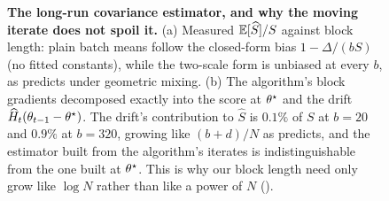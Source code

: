 \begin{figure}[tbp]
\centering
{}
\caption{\textbf{The long-run covariance estimator, and why the moving iterate does not
spoil it.} (a) Measured $\mathbb{E}[\widehat S]/S$ against block length: plain batch means follow
the closed-form bias $1-\Delta/(bS)$ (no fitted constants), while the two-scale form is
unbiased at every $b$, as  predicts under geometric mixing.
(b) The algorithm's block gradients decomposed exactly into the score at $\theta^\star$ and the
drift $\widehat H_t(\theta_{t-1}-\theta^\star)$. The drift's contribution to $\widehat S$ is $0.1\%$
of $S$ at $b=20$ and $0.9\%$ at $b=320$, growing like $(b+d)/N$ as
 predicts, and the estimator built from the algorithm's iterates is
indistinguishable from the one built at $\theta^\star$. This is why our block length need only grow like $\log N$ rather than like a power of $N$ ().}
\label{fig:lrv}
\end{figure}
